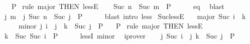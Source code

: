 \begin{isabellebody}
\ \ \ P\isanewline
%
\isadelimproof
%
\endisadelimproof
%
\isatagproof
{}\isamarkupfalse%
\ {\isacharparenleft}{\kern0pt}rule\ major\ {\isacharbrackleft}{\kern0pt}THEN\ lessE{\isacharbrackright}{\kern0pt}{\isacharparenright}{\kern0pt}\isanewline
\ \ \isamarkupfalse%
\ {\isachardoublequoteopen}Suc\ n\ {\isacharequal}{\kern0pt}\ Suc\ m\ {\isasymLongrightarrow}\ P{\isachardoublequoteclose}\isanewline
\ \ \ \ \isamarkupfalse%
\ eq\ \isamarkupfalse%
\ blast\isanewline
\ \ \isamarkupfalse%
\ {\isachardoublequoteopen}{\isasymAnd}j{\isachardot}{\kern0pt}\ {\isasymlbrakk}m\ {\isacharless}{\kern0pt}\ j{\isacharsemicolon}{\kern0pt}\ Suc\ n\ {\isacharequal}{\kern0pt}\ Suc\ j{\isasymrbrakk}\ {\isasymLongrightarrow}\ P{\isachardoublequoteclose}\isanewline
\ \ \ \ \isamarkupfalse%
\ {\isacharparenleft}{\kern0pt}blast\ intro{\isacharcolon}{\kern0pt}\ less{\isacharparenright}{\kern0pt}\isanewline
{}\isamarkupfalse%
%
\endisatagproof
{\isafoldproof}%
%
\isadelimproof
\isanewline
%
\endisadelimproof
\isanewline
{}\isamarkupfalse%
\ Suc{\isacharunderscore}{\kern0pt}lessE{\isacharcolon}{\kern0pt}\isanewline
\ \ \ major{\isacharcolon}{\kern0pt}\ {\isachardoublequoteopen}Suc\ i\ {\isacharless}{\kern0pt}\ k{\isachardoublequoteclose}\isanewline
\ \ \ \ \ minor{\isacharcolon}{\kern0pt}\ {\isachardoublequoteopen}{\isasymAnd}j{\isachardot}{\kern0pt}\ i\ {\isacharless}{\kern0pt}\ j\ {\isasymLongrightarrow}\ k\ {\isacharequal}{\kern0pt}\ Suc\ j\ {\isasymLongrightarrow}\ P{\isachardoublequoteclose}\isanewline
\ \ \ P\isanewline
%
\isadelimproof
%
\endisadelimproof
%
\isatagproof
{}\isamarkupfalse%
\ {\isacharparenleft}{\kern0pt}rule\ major\ {\isacharbrackleft}{\kern0pt}THEN\ lessE{\isacharbrackright}{\kern0pt}{\isacharparenright}{\kern0pt}\isanewline
\ \ \isamarkupfalse%
\ {\isachardoublequoteopen}k\ {\isacharequal}{\kern0pt}\ Suc\ {\isacharparenleft}{\kern0pt}Suc\ i{\isacharparenright}{\kern0pt}\ {\isasymLongrightarrow}\ P{\isachardoublequoteclose}\isanewline
\ \ \ \ \isamarkupfalse%
\ lessI\ minor\ \isamarkupfalse%
\ iprover\isanewline
\ \ \isamarkupfalse%
\ {\isachardoublequoteopen}{\isasymAnd}j{\isachardot}{\kern0pt}\ {\isasymlbrakk}Suc\ i\ {\isacharless}{\kern0pt}\ j{\isacharsemicolon}{\kern0pt}\ k\ {\isacharequal}{\kern0pt}\ Suc\ j{\isasymrbrakk}\ {\isasymLongrightarrow}\ P{\isachardoublequoteclose}\isanewline

\end{isabellebody}

